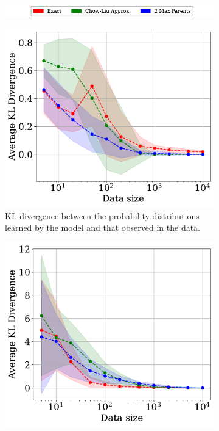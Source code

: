\begin{figure}[htp!]
     \centering
     \begin{subfigure}{0.7\textwidth}
         \centering
    \includegraphics[width=\textwidth]{plots/legends.pdf}
     \end{subfigure}
     \begin{subfigure}{0.32\textwidth}
         \centering
         \includegraphics[width=\textwidth]{plots/kl_divergence.pdf}
         \caption{KL divergence between the probability distributions learned by the model and that observed in the data.}
         \label{fig:kl_div_dist}
     \end{subfigure}
     \hfill
     \begin{subfigure}{0.32\textwidth}
         \centering
         \includegraphics[width=\textwidth]{plots/joint_dist_div.pdf}

\end{subfigure}
\end{figure}
